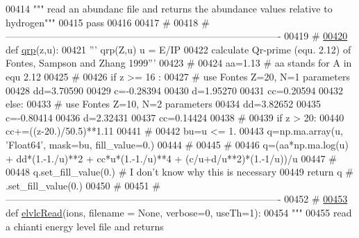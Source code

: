 \begin{DoxyCode}
{{{{{00414     \textcolor{stringliteral}{""" read an abundanc file and returns the abundance values relative to hydrogen"""}
00415     \textcolor{keywordflow}{pass}
00416 
00417     \textcolor{comment}{#}
00418     \textcolor{comment}{# -------------------------------------------------------------------------------------}
00419     \textcolor{comment}{#}
\hypertarget{__chianti__tools_8py_source_l00420}{}\hyperlink{namespacepyneb_1_1utils_1_1__chianti__tools_af9318412aecf0f6ac826b43796d594db}{00420} \textcolor{keyword}{def }\hyperlink{namespacepyneb_1_1utils_1_1__chianti__tools_af9318412aecf0f6ac826b43796d594db}{qrp}(z,u):
00421     \textcolor{stringliteral}{''' qrp(Z,u)  u = E/IP}
00422 \textcolor{stringliteral}{    calculate Qr-prime (equ. 2.12) of Fontes, Sampson and Zhang 1999'''}
00423     \textcolor{comment}{#}
00424     aa=1.13  \textcolor{comment}{# aa stands for A in equ 2.12}
00425     \textcolor{comment}{#}
00426     \textcolor{keywordflow}{if} z >= 16 :
00427         \textcolor{comment}{# use Fontes Z=20, N=1 parameters}
00428         dd=3.70590
00429         c=-0.28394
00430         d=1.95270
00431         cc=0.20594
00432     \textcolor{keywordflow}{else}:
00433     \textcolor{comment}{# use Fontes Z=10, N=2 parameters}
00434         dd=3.82652
00435         c=-0.80414
00436         d=2.32431
00437         cc=0.14424
00438     \textcolor{comment}{#}
00439     \textcolor{keywordflow}{if} z > 20:
00440         cc+=((z-20.)/50.5)**1.11
00441     \textcolor{comment}{#}
00442     bu=u <= 1.
00443     q=np.ma.array(u, \textcolor{stringliteral}{'Float64'}, mask=bu, fill\_value=0.)
00444     \textcolor{comment}{#}
00445     \textcolor{comment}{#}
00446     q=(aa*np.ma.log(u) + dd*(1.-1./u)**2 + cc*u*(1.-1./u)**4 + (c/u+d/u**2)*(1.-1/u))/u
00447     \textcolor{comment}{#}
00448     q.set\_fill\_value(0.)  \textcolor{comment}{# I don't know why this is necessary}
00449     \textcolor{keywordflow}{return} q  \textcolor{comment}{#  .set\_fill\_value(0.)}
00450     \textcolor{comment}{#}
00451     \textcolor{comment}{# -------------------------------------------------------------------------------------}
00452     \textcolor{comment}{#}
\hypertarget{__chianti__tools_8py_source_l00453}{}\hyperlink{namespacepyneb_1_1utils_1_1__chianti__tools_ac848d0b5ea14bf4adf6e8cd5d46fb639}{00453} \textcolor{keyword}{def }\hyperlink{namespacepyneb_1_1utils_1_1__chianti__tools_ac848d0b5ea14bf4adf6e8cd5d46fb639}{elvlcRead}(ions, filename = None, verbose=0,  useTh=1):
00454     \textcolor{stringliteral}{"""}
00455 \textcolor{stringliteral}{    read a chianti energy level file and returns}
}}}}}
\end{DoxyCode}
